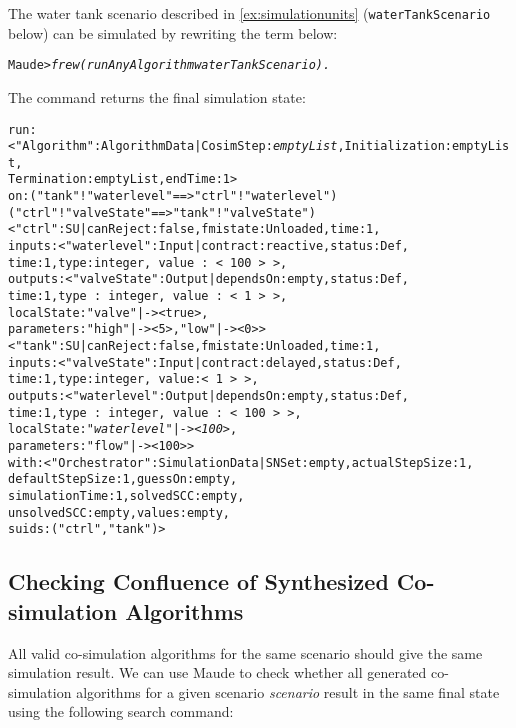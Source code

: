 \begin{example}\label{ex:algoexecution}
The water tank scenario described in \cref{ex:simulationunits} (\texttt{waterTankScenario} below) can be simulated by rewriting the term below:
\small
\begin{alltt}
Maude> \emph{frew (runAnyAlgorithm waterTankScenario) .}
\end{alltt}
\normalsize
The command returns the final simulation state:
\scriptsize
\begin{alltt}
run: < "Algorithm" : AlgorithmData | CosimStep : \emph{emptyList}, Initialization : emptyList,
                                     Termination : emptyList, endTime : 1 > 
on: ("tank" ! "waterlevel" ==> "ctrl" ! "waterlevel") 
    ("ctrl" ! "valveState" ==> "tank" ! "valveState")
    < "ctrl" : SU | canReject : false, fmistate : Unloaded, time : 1,
                    inputs : < "waterlevel" : Input | contract : reactive, status : Def, 
                                                      time : 1, type : integer,\,value\,:\,<\,100\,>\,>,
                    outputs : < "valveState" : Output | dependsOn : empty, status : Def, 
                                                        time : 1, type\,:\,integer,\,value\,:\,<\,1\,>\,>,
                    localState : "valve" |-> < true >,    
                    parameters :"high" |-> < 5 >, "low" |-> < 0 >  > 
    < "tank" : SU | canReject : false, fmistate : Unloaded, time : 1,
                    inputs : < "valveState" : Input | contract : delayed, status : Def,
                                                      time : 1, type : integer,\,value : <\,1\,>\,>,
                    outputs : < "waterlevel" : Output | dependsOn : empty, status : Def,
                                                        time : 1, type\,:\,integer,\,value\,:\,<\,100\,>\,>,
                    localState : \emph{"waterlevel" |-> < 100 >},
                    parameters : "flow" |-> < 100 > > 
with: < "Orchestrator" : SimulationData | SNSet : empty,       actualStepSize : 1, 
                                          defaultStepSize : 1, guessOn : empty,
                                          simulationTime : 1,  solvedSCC : empty, 
                                          unsolvedSCC : empty, values : empty,
                                          suids :("ctrl", "tank") >
\end{alltt}
\normalsize
\end{example}

\subsection{Checking Confluence of Synthesized Co-simulation Algorithms}
All valid co-simulation algorithms for the same scenario should give the same simulation result.
We can use Maude to check whether all generated co-simulation algorithms for a given scenario \emph{scenario} result in the same final state using the following search command:


